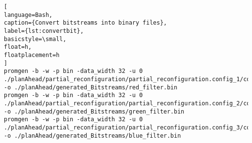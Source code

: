 \begin{lstlisting}[
language=Bash,
caption={Convert bitstreams into binary files},
label={lst:convertbit},
basicstyle=\small,
float=h,
floatplacement=h
]
promgen -b -w -p bin -data_width 32 -u 0 ./planAhead/partial_reconfiguration/partial_reconfiguration.config_1/config_1_simple_filter_0_simple_filter_0_USER_LOGIC_I_filter_logic_0_red_filter_partial.bit -o ./planAhead/generated_Bitstreams/red_filter.bin
promgen -b -w -p bin -data_width 32 -u 0 ./planAhead/partial_reconfiguration/partial_reconfiguration.config_2/config_2_simple_filter_0_simple_filter_0_USER_LOGIC_I_filter_logic_0_green_filter_partial.bit -o ./planAhead/generated_Bitstreams/green_filter.bin
promgen -b -w -p bin -data_width 32 -u 0 ./planAhead/partial_reconfiguration/partial_reconfiguration.config_3/config_3_simple_filter_0_simple_filter_0_USER_LOGIC_I_filter_logic_0_blue_filter_partial.bit -o ./planAhead/generated_Bitstreams/blue_filter.bin
\end{lstlisting}